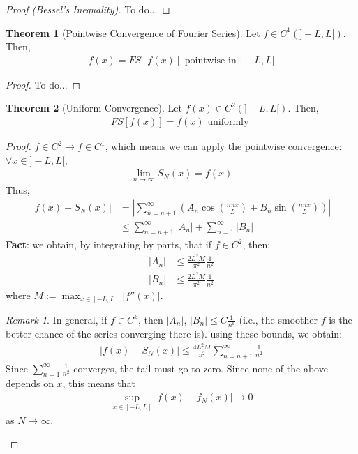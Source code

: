 \documentclass[11pt]{scrartcl}
\theoremstyle{definition}
\newtheorem{theorem}{Theorem}
\theoremstyle{remark}
\newtheorem{remark}{Remark}
\begin{document}
\begin{proof}[Proof (Bessel's Inequality)]
	To do...
\end{proof}

\begin{theorem}[Pointwise Convergence of Fourier Series]
	Let $f \in C^1(]-L, L[)$. Then, 
	\begin{align*}
		f(x) = FS[f(x)] \text{ pointwise in } ]-L, L[
	\end{align*}
\end{theorem}

\begin{proof}
	To do...
\end{proof}

\begin{theorem}[Uniform Convergence]
	Let $f(x) \in C^2(]-L, L[)$. Then, 
	\begin{align*}
		FS[f(x)] = f(x) \text{ uniformly }
	\end{align*}
\end{theorem}

\begin{proof}
	$f \in C^2 \rightarrow f \in C^1$, which means we can apply the pointwise convergence: $\forall x \in ]-L, L[$, 
	\begin{align}
		\lim_{n \rightarrow \infty} S_N(x) = f(x) 	
	\end{align}
	Thus, 
	\begin{align*}
		|f(x) - S_N(x) | & = \left| \sum_{n=n+1}^\infty \left( A_n \cos \left( \frac{n \pi x}{L} \right) + B_n \sin \left( \frac{n \pi x}{L} \right) \right)  \right|  \\
		& \leq \sum_{n=n+1}^\infty |A_n| + \sum_{n=1}^\infty |B_n|
	\end{align*}
	\textbf{Fact}: we obtain, by integrating by parts, that if $f \in C^2$, then: 
	\begin{align*}
		|A_n| & \leq \frac{2L^2 M}{\pi^2} \frac{1}{n^2} \\
		|B_n| & \leq \frac{2L^2 M}{\pi^2} \frac{1}{n^2}
	\end{align*}
	where $M:= \max_{x \in [-L,L]} |f''(x)|$.
	\begin{remark}
		In general, if $f \in C^k$, then $|A_n|$, $|B_n| \leq C \frac{1}{n^k}$ (i.e., the smoother $f$ is the better chance of the series converging there is). using these bounds, we obtain: 
		\begin{align*}
			|f(x) - S_N(x)| \leq \frac{4L^2 M}{\pi^2} \sum_{n = n+1}^\infty \frac{1}{n^2}
		\end{align*}
		Since $\sum_{n=1}^\infty \frac{1}{n^2}$ converges, the tail must go to zero. Since none of the above depends on $x$, this means that
		\begin{align*}
			\sup_{x \in [-L, L]} |f(x) - f_N(x)| \rightarrow 0 
		\end{align*}
		as $N \rightarrow \infty$.
	\end{remark}
\end{proof}
\end{document}
